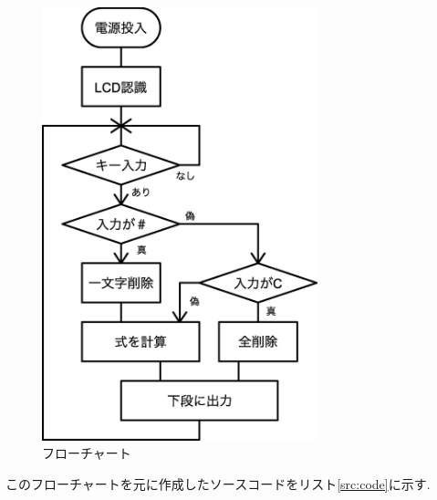 \documentclass[titlepage]{jsarticle}
\begin{document}
    \begin{figure}[h]
        \centering
        \includegraphics[width=8cm]{img/flowchart.eps}
        \caption{フローチャート}
        \label{fig:flowchart}
    \end{figure}

    このフローチャートを元に作成したソースコードをリスト\ref{src:code}に示す.
\end{document}
